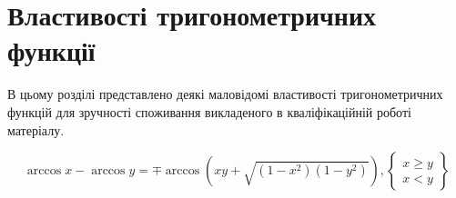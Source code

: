 \chapter{Властивості тригонометричних функції}
\label{ch:trigonometric}

В цьому розділі представлено деякі маловідомі властивості тригонометричних 
функцій для зручності споживання викладеного в кваліфікаційній роботі 
матеріалу.

%
\begin{equation}
\arccos x - \arccos y = \mp \arccos \left( 
xy + \sqrt{(1-x^2)(1-y^2)} \right),
\left\{ \begin{array}{c} x \ge y \\ x < y  \end{array} \right\}
\end{equation}
